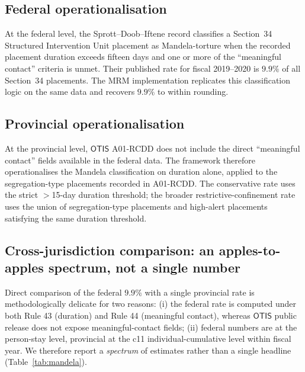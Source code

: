 \documentclass[article,shortnames,nojss]{jss}
\newcommand{\OTIS}{\textsf{OTIS}}
\begin{document}
\subsection{Federal operationalisation}

At the federal level, the Sprott--Doob--Iftene record
\citep{SprottDoob2021} classifies a Section~34 Structured
Intervention Unit placement as Mandela-torture when the recorded
placement duration exceeds fifteen days and one or more of the
``meaningful contact'' criteria is unmet. Their published rate for
fiscal 2019--2020 is $9.9\%$ of all Section~34 placements. The
MRM implementation replicates this classification logic on the
same data and recovers $9.9\%$ to within rounding.

\subsection{Provincial operationalisation}

At the provincial level, $\OTIS$ A01-RCDD does not include the
direct ``meaningful contact'' fields available in the federal
data. The framework therefore operationalises the Mandela
classification on duration alone, applied to the segregation-type
placements recorded in A01-RCDD. The conservative rate uses the
strict $>$15-day duration threshold; the broader
restrictive-confinement rate uses the union of segregation-type
placements and high-alert placements satisfying the same duration
threshold.

\subsection{Cross-jurisdiction comparison: an apples-to-apples
spectrum, not a single number}
\label{sec:mandela-comparison}

Direct comparison of the federal $9.9\%$
\citep{SprottDoob2021} with a single provincial rate is
methodologically delicate for two reasons: (i) the federal rate
is computed under both Rule 43 (duration) and Rule 44 (meaningful
contact), whereas $\OTIS{}$ public release does not expose
meaningful-contact fields; (ii) federal numbers are at the
person-stay level, provincial at the c11 individual-cumulative
level within fiscal year.  We therefore report a
\emph{spectrum} of estimates rather than a single headline
(Table~\ref{tab:mandela}).
\end{document}
